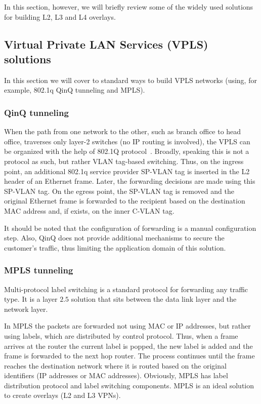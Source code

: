 In this section, however, we will briefly review some of the widely used solutions 
for building L2, L3 and L4 overlays.

\subsection{Virtual Private LAN Services (VPLS) solutions}

In this section we will cover 
to standard ways to build VPLS networks (using, for example, 802.1q QinQ tunneling and MPLS).

\subsubsection{QinQ tunneling}

When the path from one network to the other, such as branch office to head office,
traverses only layer-2 switches (\ie no IP routing is involved), the VPLS can be organized 
with the help of 802.1Q protocol~\cite{snr}. Broadly, speaking this is not a protocol as such, but rather 
VLAN tag-based switching. Thus, on the ingress point, an additional 802.1q service provider SP-VLAN tag 
is inserted in the L2 header of an Ethernet frame. Later, the forwarding decisions are 
made using this SP-VLAN tag. On the egress point, the SP-VLAN tag is removed and the original 
Ethernet frame is forwarded to the recipient based on the destination MAC address 
and, if exists, on the inner C-VLAN tag. 

It should be noted that the configuration of forwarding is a manual configuration step.
Also, QinQ does not provide additional mechanisms to secure the customer's traffic,
thus limiting the application domain of this solution.

\subsubsection{MPLS tunneling}

Multi-protocol label switching is a standard protocol for forwarding any traffic type.
It is a layer $2.5$ solution that sits between the data link layer and the network layer.

In MPLS the packets are forwarded not using MAC or IP addresses, but 
rather using labels, which are distributed by control protocol. Thus, when a frame 
arrives at the router the current label is popped, the new label is added and the frame is
forwarded to the next hop router. The process continues until the frame reaches the 
destination network where it is routed based on the original identifiers (IP addresses or MAC addresses).
Obviously, MPLS has label distribution protocol and label switching components.
MPLS is an ideal solution to create overlays (\ie L2 and L3 VPNs).

